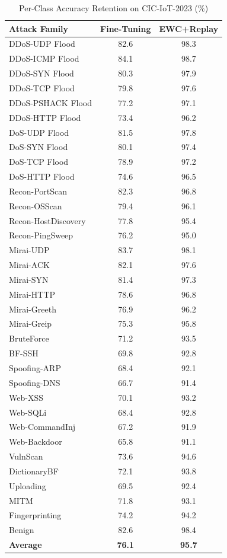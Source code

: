 \documentclass[journal]{IEEEtran}
\begin{document}
\begin{table}[!t]
\centering
\caption{Per-Class Accuracy Retention on CIC-IoT-2023 (\%)}
\label{tab:perclass_full}
\begin{tabular}{@{}lcc@{}}
\toprule
\textbf{Attack Family} & \textbf{Fine-Tuning} & \textbf{EWC+Replay} \\
\midrule
DDoS-UDP Flood & 82.6 & 98.3 \\
DDoS-ICMP Flood & 84.1 & 98.7 \\
DDoS-SYN Flood & 80.3 & 97.9 \\
DDoS-TCP Flood & 79.8 & 97.6 \\
DDoS-PSHACK Flood & 77.2 & 97.1 \\
DDoS-HTTP Flood & 73.4 & 96.2 \\
DoS-UDP Flood & 81.5 & 97.8 \\
DoS-SYN Flood & 80.1 & 97.4 \\
DoS-TCP Flood & 78.9 & 97.2 \\
DoS-HTTP Flood & 74.6 & 96.5 \\
Recon-PortScan & 82.3 & 96.8 \\
Recon-OSScan & 79.4 & 96.1 \\
Recon-HostDiscovery & 77.8 & 95.4 \\
Recon-PingSweep & 76.2 & 95.0 \\
Mirai-UDP & 83.7 & 98.1 \\
Mirai-ACK & 82.1 & 97.6 \\
Mirai-SYN & 81.4 & 97.3 \\
Mirai-HTTP & 78.6 & 96.8 \\
Mirai-Greeth & 76.9 & 96.2 \\
Mirai-Greip & 75.3 & 95.8 \\
BruteForce & 71.2 & 93.5 \\
BF-SSH & 69.8 & 92.8 \\
Spoofing-ARP & 68.4 & 92.1 \\
Spoofing-DNS & 66.7 & 91.4 \\
Web-XSS & 70.1 & 93.2 \\
Web-SQLi & 68.4 & 92.8 \\
Web-CommandInj & 67.2 & 91.9 \\
Web-Backdoor & 65.8 & 91.1 \\
VulnScan & 73.6 & 94.6 \\
DictionaryBF & 72.1 & 93.8 \\
Uploading & 69.5 & 92.4 \\
MITM & 71.8 & 93.1 \\
Fingerprinting & 74.2 & 94.2 \\
Benign & 82.6 & 98.4 \\
\midrule
\textbf{Average} & \textbf{76.1} & \textbf{95.7} \\
\bottomrule
\end{tabular}
\end{table}
\end{document}
